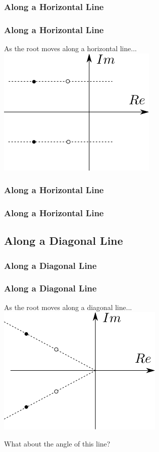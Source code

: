 \documentclass[fleqn]{beamer} %
\newcommand{\sectionIIIsubsectionIIItitle}{Along a Horizontal Line}
\newcommand{\sectionIIIsubsectionIVtitle}{Along a Diagonal Line}
\begin{document}
			\begin{frame}
				\frametitle{\sectionIIIsubsectionIIItitle}
				\bigskip

				\frametitle{Along a Horizontal Line}
 	
				As the root moves along a horizontal line...\vspc
				\includegraphics[scale=0.5]{images/lecture3_fig3.png}
				
	
				\btVFill
			\end{frame}

			\begin{frame}
				\frametitle{\sectionIIIsubsectionIIItitle}
				\bigskip


				\btVFill
			\end{frame}

			\begin{frame}
				\frametitle{\sectionIIIsubsectionIIItitle}
				\bigskip

				\btVFill
			\end{frame}

		\subsection{\sectionIIIsubsectionIVtitle}\label{sectionIIIsubsectionIV}	

			\begin{frame}[containsverbatim]
				\frametitle{\sectionIIIsubsectionIVtitle}
				\bigskip

				\frametitle{Along a Diagonal Line}
 	
				As the root moves along a diagonal line...\vspc
				\includegraphics[scale=0.5]{images/lecture3_fig4.png}

				What about the angle of this line?

				\btVFill 
			\end{frame}
\end{document}
